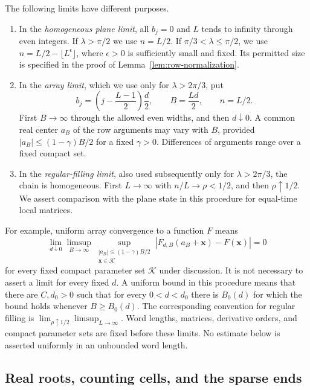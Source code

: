 The following limits have different purposes.
\begin{enumerate}
\item In the \emph{homogeneous plane limit}, all $b_j=0$ and $L$
 tends to infinity through even integers.  If $\lambda>\pi/2$ we
 use $n=L/2$.  If $\pi/3<\lambda\le\pi/2$, we use
 $n=L/2-\lfloor L^\epsilon\rfloor$, where $\epsilon>0$ is
 sufficiently small and fixed.  Its permitted size is specified in
 the proof of Lemma~\ref{lem:row-normalization}.
\item In the \emph{array limit}, which we use only for
 $\lambda>2\pi/3$, put
 \[
 b_j=\left(j-\frac{L-1}{2}\right)\frac d2,\qquad
 B=\frac{Ld}{2},\qquad n=L/2.
 \]
 First $B\to\infty$ through the allowed even widths, and then
 $d\downarrow0$.  A common real center $a_B$ of the row arguments
 may vary with $B$, provided
 $|a_B|\le(1-\gamma)B/2$ for a fixed $\gamma>0$.
 Differences of arguments range over a fixed compact set.
\item In the \emph{regular-filling limit}, also used subsequently
 only for $\lambda>2\pi/3$, the chain is homogeneous.  First
 $L\to\infty$ with $n/L\to\rho<1/2$, and then
 $\rho\uparrow1/2$.  We assert comparison with the plane state in
 this procedure for equal-time local matrices.
\end{enumerate}
For example, uniform array convergence to a function $F$ means
\begin{equation}\label{eq:array-limit-convention}
 \lim_{d\downarrow0}\limsup_{B\to\infty}
 \sup_{\substack{|a_B|\le(1-\gamma)B/2\\
                  \boldsymbol{x}\in\mathcal K}}
 |F_{d,B}(a_B+\boldsymbol{x})-F(\boldsymbol{x})|=0
\end{equation}
for every fixed compact parameter set $\mathcal K$ under discussion.
It is not necessary to assert a limit for every fixed $d$.
A uniform bound in this procedure means that there are $C,d_0>0$
such that for every $0<d<d_0$ there is $B_0(d)$ for which the bound
holds whenever $B\ge B_0(d)$.  The corresponding convention for
regular filling is $\lim_{\rho\uparrow1/2}\limsup_{L\to\infty}$.
Word lengths, matrices, derivative orders, and compact parameter
sets are fixed before these limits.  No estimate below is asserted
uniformly in an unbounded word length.

\subsection{Real roots, counting cells, and the sparse ends}

